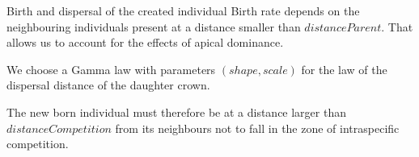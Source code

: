 \documentclass{myBeamer}
\begin{document}
\begin{frame}{Birth and dispersal of the created individual}
Birth rate  depends on the neighbouring individuals present at a distance smaller than $distanceParent$. That allows us to account for the effects of apical dominance.

\bigbreak
\begin{minipage}{0.55\linewidth}
We choose a Gamma law with parameters $(shape,scale)$ for the law of the dispersal distance of the daughter crown. %
\end{minipage}
\begin{minipage}{0.35\linewidth}
\begin{figure}[H] 
\end{figure}
\end{minipage}

\bigbreak
The new born individual must therefore be at a distance larger than $distanceCompetition$ from its neighbours not to fall in the zone of intraspecific competition.


\end{frame}
\end{document}
